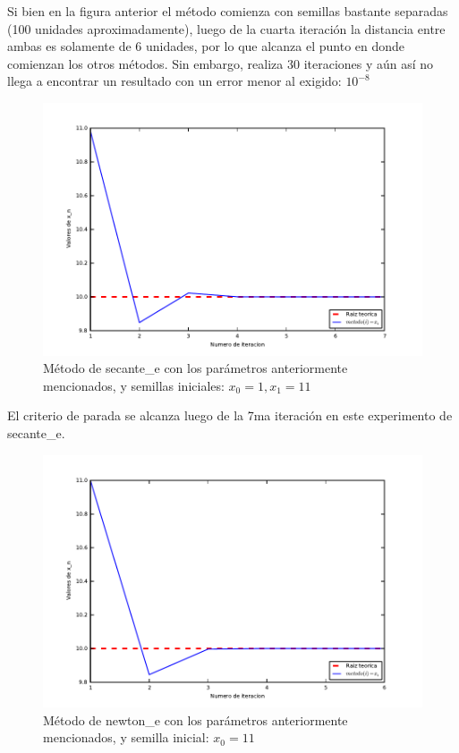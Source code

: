 Si bien en la figura anterior el método comienza con semillas bastante separadas (100 unidades aproximadamente), luego de la cuarta iteración la distancia entre ambas es solamente de 6 unidades, por lo que
alcanza el punto en donde comienzan los otros métodos. Sin embargo, realiza 30 iteraciones y aún así no llega a encontrar un resultado con un error menor al exigido: $10^{-8}$

\begin{figure}[!h]
	\begin{center}
		  \includegraphics[keepaspectratio]{../Imagenes/exp2/secante_e.pdf}
		  \caption{Método de secante\_e con los parámetros anteriormente mencionados, y semillas iniciales: $x_0=1, x_1=11$ }
		  \label{fig:contra1}
	\end{center}
\end{figure}
\FloatBarrier

El criterio de parada se alcanza luego de la 7ma iteración en este experimento de secante\_e.

\begin{figure}[!h]
	\begin{center}
		  \includegraphics[keepaspectratio]{../Imagenes/exp2/newton_e.pdf}
		  \caption{Método de newton\_e con los parámetros anteriormente mencionados, y semilla inicial: $x_0=11$}
		  \label{fig:contra1}
	\end{center}
\end{figure}
\FloatBarrier

